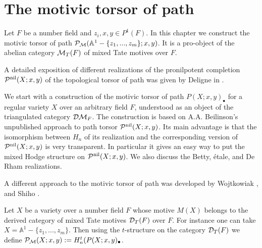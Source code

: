 \documentclass[10pt]{article}
\begin{document}
\section{ The motivic torsor of path}


Let $F$ be  a number field and $z_i, x,y \in P^1(F)$. 
In this chapter we construct the motivic torsor of path 
${\cal P}_{\cal M}({\mathbb A}^1 - \{z_1, ..., z_{m}\}; x,y)$. 
It is a pro-object of the abelian category 
${\cal M}_T(F)$ of mixed Tate motives over $F$. 


A  detailed exposition of different  realizations of the pronilpotent completion 
${\cal P}^{\rm nil}(X; x,y)$ of the topological 
 torsor of path 
   was given by  Deligne in  \cite{D}.

We start with a construction of the motivic torsor of path $P(X; x,y)_{\bullet}$ for a 
 regular variety $X$ over an arbitrary field $F$, understood as an object of the 
triangulated category ${\cal D}{\cal M}_F$. The 
construction is 
based on  A.A. Beilinson's unpublished approach to  path torsor 
${\cal P}^{\rm nil}(X; x,y)$.  Its main advantage is that the isomorphism between 
$H_n$ of its  realization and  the corresponding 
version of ${\cal P}^{\rm nil}(X; x,y)$ is very transparent.  
In particular it gives  an  easy 
 way to 
put the mixed Hodge structure on ${\cal P}^{\rm nil}(X; x,y)$. 
We also discuss the   Betty, \'etale,   and  
De Rham  realizations. 


A different  approach to the motivic torsor of path was 
developed by Wojtkowiak  \cite{W2},  and 
Shiho \cite{Sh}.  

Let $X$ be a variety over a number field $F$ whose motive  $M(X)$ belongs to the  
derived category of mixed Tate motives ${\cal D}_T(F)$ over $F$.  For instance  
one can take  $X =  {\mathbb A}^1 - \{z_1, ..., z_{m}\}$. Then 
using the $t$-structure on 
the category ${\cal D}_T(F)$ we define  
${\cal P}_{{\cal M}}(X; x,y):= H_n^t(P(X; x,y)_{\bullet}$.
\end{document}
